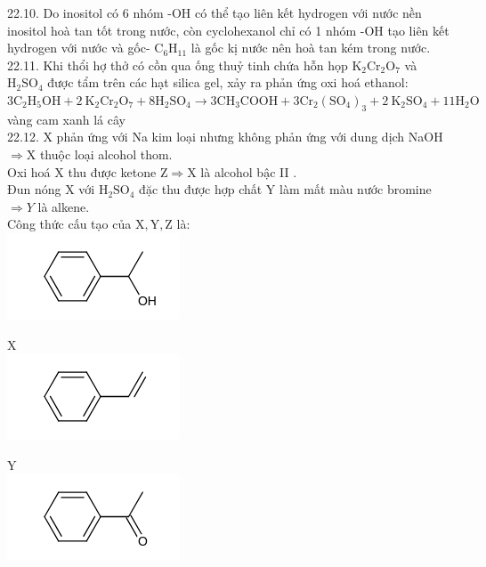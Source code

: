 \documentclass[10pt]{article}
\begin{document}
22.10. Do inositol có 6 nhóm -OH có thể tạo liên kết hydrogen với nước nền inositol hoà tan tốt trong nước, còn cyclohexanol chỉ có 1 nhóm -OH tạo liên kết hydrogen với nước và gốc- $\mathrm{C}_{6} \mathrm{H}_{11}$ là gốc kị nước nên hoà tan kém trong nước.\\
22.11. Khi thổi hợ thở có cồn qua ống thuỷ tinh chứa hỗn họp $\mathrm{K}_{2} \mathrm{Cr}_{2} \mathrm{O}_{7}$ và $\mathrm{H}_{2} \mathrm{SO}_{4}$ được tẩm trên các hạt silica gel, xảy ra phản ứng oxi hoá ethanol:\\
$3 \mathrm{C}_{2} \mathrm{H}_{5} \mathrm{OH}+2 \mathrm{~K}_{2} \mathrm{Cr}_{2} \mathrm{O}_{7}+8 \mathrm{H}_{2} \mathrm{SO}_{4} \rightarrow 3 \mathrm{CH}_{3} \mathrm{COOH}+3 \mathrm{Cr}_{2}\left(\mathrm{SO}_{4}\right)_{3}+2 \mathrm{~K}_{2} \mathrm{SO}_{4}+11 \mathrm{H}_{2} \mathrm{O}$ vàng cam xanh lá cây\\
22.12. X phản ứng với Na kim loại nhưng không phản ứng với dung dịch NaOH\\
$\Rightarrow \mathrm{X}$ thuộc loại alcohol thom.\\
Oxi hoá X thu được ketone $\mathrm{Z} \Rightarrow \mathrm{X}$ là alcohol bậc II .\\
Đun nóng X với $\mathrm{H}_{2} \mathrm{SO}_{4}$ đặc thu được hợp chất Y làm mất màu nước bromine\\
$\Rightarrow Y$ là alkene.\\
Công thức cấu tạo của $\mathrm{X}, \mathrm{Y}, \mathrm{Z}$ là:\\
\includegraphics{smile-250d15ae7a0e2d611c2cdc5a4ee62a1c0fe8ab87}

X\\
\includegraphics{smile-dc275f333b368afdc308357c6f8bbc3d9e3fb9d9}

Y\\
\includegraphics{smile-77e1ebbf073f93eef0b6ae013dae904ac6737393}
\end{document}

